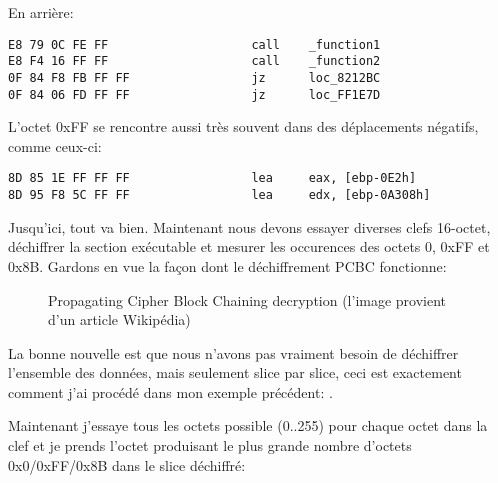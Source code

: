En arrière:

\begin{lstlisting}[style=customasmx86]
E8 79 0C FE FF                    call    _function1
E8 F4 16 FF FF                    call    _function2
0F 84 F8 FB FF FF                 jz      loc_8212BC
0F 84 06 FD FF FF                 jz      loc_FF1E7D
\end{lstlisting}

L'octet 0xFF se rencontre aussi très souvent dans des déplacements négatifs, comme
ceux-ci:

\begin{lstlisting}[style=customasmx86]
8D 85 1E FF FF FF                 lea     eax, [ebp-0E2h]
8D 95 F8 5C FF FF                 lea     edx, [ebp-0A308h]
\end{lstlisting}

Jusqu'ici, tout va bien. Maintenant nous devons essayer diverses clefs 16-octet, déchiffrer
la section exécutable et mesurer les occurences des octets 0, 0xFF et 0x8B.
Gardons en vue la façon dont le déchiffrement PCBC fonctionne:

\begin{figure}[H]
\centering
{}
\caption{Propagating Cipher Block Chaining decryption (l'image provient d'un article Wikipédia)}
\end{figure}

La bonne nouvelle est que nous n'avons pas vraiment besoin de déchiffrer l'ensemble
des données, mais seulement slice par slice, ceci est exactement comment j'ai procédé
dans mon exemple précédent: .

Maintenant j'essaye tous les octets possible (0..255) pour chaque octet dans la clef
et je prends l'octet produisant le plus grande nombre d'octets 0x0/0xFF/0x8B dans le slice
déchiffré:

